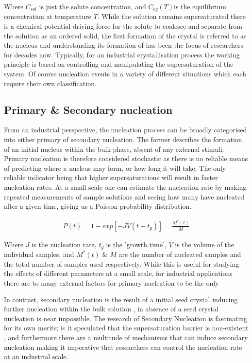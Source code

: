 Where $C_{sol}$ is just the solute concentration, and $C_{eq}(T)$is the 
equilibrium concentration at temperature $T$. While the solution remains 
supersaturated there is a chemical potential driving force for the solute 
to coalesce and separate from the solution as an ordered solid, the first 
formation of the crystal is referred to as the nucleus and understanding its 
formation of has been the focus of researchers for decades now. Typically, 
for an industrial crystallisation process the working principle is based on 
controlling and manipulating the supersaturation of the system. Of course 
nucleation events in a variety of different situations which each require 
their own classification. 

\subsection{Primary \& Secondary nucleation}
From an industrial perspective, the nucleation process can be broadly 
categorised into either primary of secondary nucleation. The former 
describes the formation of an initial nucleus within the bulk phase, 
absent of any external stimuli. Primary nucleation is therefore considered 
stochastic as there is no reliable means of predicting where a nucleus
may form, or how long it will take. The only reliable indicator being 
that higher supersaturations will result in faster nucleation rates. At 
a small scale one can estimate the nucleation rate by making repeated 
measurements of sample solutions and seeing how many have nucleated 
after a given time, giving us a Poisson probability distribution.

\begin{align}
	P(t) = 1 - exp\left[-JV(t-t_g)\right] = \frac{M^*(t)}{M}
\end{align}

Where $J$ is the nucleation rate, $t_g$ is the 'growth time', $V$ is 
the volume of the individual samples, and $M^*(t)$ \& $M$ are the number 
of nucleated samples and the total number of samples used respectively.
While this is useful for studying the effects of different parameters at 
a small scale, for industrial applications there are to many external 
factors for primary nucleation to be the only 

In contrast, secondary nucleation is the result of a initial 
seed crystal inducing further nucleation within the bulk solution
\cite{Botsaris1976}, in absence of a seed crystal nucleation is
near impossible. The research of Secondary Nucleation is fascinating
for its own merits; is it speculated that the supersaturation 
barrier is non-existent \cite{Cashmore2022}, and furthermore there 
are a multitude of mechanisms that can induce secondary 
nucleation making it imperative that researchers can control the
nucleation rate at an industrial scale. 

